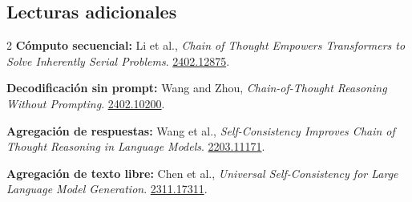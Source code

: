 \subsection{Lecturas adicionales}

\scriptsize
\begin{multicols}{2}
\noindent\textbf{Cómputo secuencial: }Li et al., \emph{Chain of Thought Empowers Transformers to Solve Inherently Serial Problems}. \href{https://arxiv.org/abs/2402.12875}{2402.12875}.\par
\noindent\textbf{Decodificación sin prompt: }Wang and Zhou, \emph{Chain-of-Thought Reasoning Without Prompting}. \href{https://arxiv.org/abs/2402.10200}{2402.10200}.\par
\noindent\textbf{Agregación de respuestas: }Wang et al., \emph{Self-Consistency Improves Chain of Thought Reasoning in Language Models}. \href{https://arxiv.org/abs/2203.11171}{2203.11171}.\par
\noindent\textbf{Agregación de texto libre: }Chen et al., \emph{Universal Self-Consistency for Large Language Model Generation}. \href{https://arxiv.org/abs/2311.17311}{2311.17311}.\par
\end{multicols}
\normalsize



